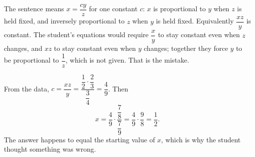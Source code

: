 The sentence means $x=\dfrac{cy}{z}$ for one constant $c$: $x$ is proportional to $y$ when $z$ is held fixed, and inversely proportional to $z$ when $y$ is held fixed. Equivalently $\dfrac{xz}{y}$ is constant. The student's equations would require $\dfrac {x}{y}$ to stay constant even when $z$ changes, and $xz$ to stay constant even when $y$ changes; together they force $y$ to be proportional to $\dfrac{1}{z}$, which is not given. That is the mistake.

From the data, $c=\dfrac{xz}{y}=\dfrac{\dfrac{1}{2}\cdot\dfrac{2}{3}}{\dfrac{3}{4}}=\dfrac{4}{9}$. Then
\[
x=\dfrac{4}{9}\cdot\dfrac{\dfrac{7}{8}}{\dfrac{7}{9}}=\dfrac{4}{9}\cdot\dfrac{9}{8}=\boxed{\dfrac{1}{2}}.
\]
The answer happens to equal the starting value of $x$, which is why the student thought something was wrong.
